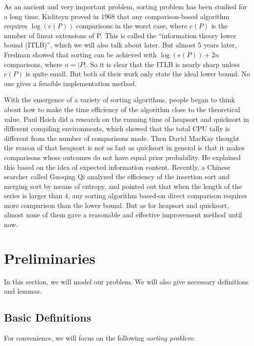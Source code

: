 \documentclass[12pt]{extarticle}
\newcommand{\<}{\langle}
\renewcommand{\>}{\rangle}
\theoremstyle{definition}
\begin{document}
As an ancient and very important problem, sorting problem has been studied for a long time. Kislitsyn proved in 1968 \cite{kislitsyn1968a} that any comparison-based algorithm requires $\log(e(P))$ comparisons in the worst case, where $e(P)$ is the number of linear extensions of P. This is called the ``information theory lower bound (ITLB)'', which we will also talk about later. But almost 5 years later, Fredman \cite{fredman1976how} showed that sorting can be achieved with $\log(e(P))+2n$ comparisons, where $n=|P|$. So it is clear that the ITLB is nearly sharp unless $e(P)$ is quite small. But both of their work only state the ideal lower bound. No one gives a feasible implementation method.

With the emergence of a variety of sorting algorithms, people began to think about how to make the time efficiency of the algorithm close to the theoretical value. Paul Hsieh \cite{paul1} did a research on the running time of heapsort and quicksort in different compiling environments, which showed that the total CPU tally is different from the number of comparisons made. Then David MacKay \cite{mackay1} thought the reason of that heapsort is not as fast as quicksort in general is that it makes comparisons whose outcomes do not have equal prior probability. He explained this based on the idea of expected information content. Recently, a Chinese searcher called Guoqing Qi \cite{guo2002application} analyzed the efficiency of the insertion sort and merging sort by means of entropy, and pointed out that when the length of the series is larger than $4$, any sorting algorithm based-on direct comparison requires more comparison than the lower bound. But as for heapsort and quicksort, almost none of them gave a reasonable and effective improvement method until now.
	
\section{Preliminaries}

In this section, we will model our problem. We will also give necessary definitions and lemmas. 

\subsection{Basic Definitions}

For convenience, we will focus on the following \textit{sorting problem}:

\begin{algorithm}
	\label{algo:problem1}
\end{algorithm}
\end{document}
